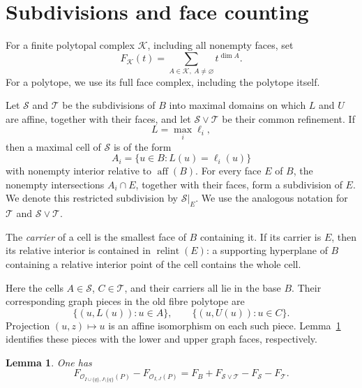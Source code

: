 \documentclass[a4paper,12pt]{amsart}
\newtheorem{lemma}[theorem]{Lemma}
\theoremstyle{definition}
\theoremstyle{remark}
\newcommand{\OO}{\mathcal O}
\newcommand{\relint}{\operatorname{relint}}
\begin{document}
\section{Subdivisions and face counting}\label{sec:counting}

For a finite polytopal complex $\mathcal K$, including all nonempty faces, set
\[
 F_{\mathcal K}(t)=  \sum_{A\in\mathcal K,\ A\neq\varnothing}t^{\dim A}.
\]
For a polytope, we use its full face complex, including the polytope itself.

Let $\mathcal S$ and $\mathcal T$ be the subdivisions of $B$ into maximal domains on which $L$ and $U$ are affine, together with their faces, and let $\mathcal S\vee\mathcal T$ be their common refinement. 
If
\[
 L=\max_i\ell_i,
\]
then a maximal cell of $\mathcal S$ is of the form
\[
 A_i=\{u\in B:L(u)=\ell_i(u)\}
\]
with nonempty interior relative to $\operatorname{aff}(B)$. 
For every face $E$ of $B$, the nonempty intersections $A_i\cap E$, together with their faces, form a subdivision of $E$. 
We denote this restricted subdivision by $\mathcal S|_E$. 
We use the analogous notation for $\mathcal T$ and $\mathcal S\vee\mathcal T$.

The \emph{carrier} of a cell is the smallest face of $B$ containing it. 
If its carrier is $E$, then its relative interior is contained in $\relint(E)$: a supporting hyperplane of $B$ containing a relative interior point of the cell contains the whole cell.

Here the cells $A\in\mathcal S$, $C\in\mathcal T$, and their carriers all lie in the base $B$. 
Their corresponding graph pieces in the old fibre polytope are
\[
 \{(u,L(u)):u\in A\},\qquad  \{(u,U(u)):u\in C\}.
\]
Projection $(u,z)\mapsto u$ is an affine isomorphism on each such piece. 
Lemma~\ref{lem:faceidentity} identifies these pieces with the lower and upper graph faces, respectively.


\begin{lemma}\label{lem:faceidentity}
One has
\begin{equation}\label{eq:faceidentity}
 F_{\OO_{I\cup\{q\},J\setminus\{q\}}(P)}-F_{\OO_{I,J}(P)}  =F_B+F_{\mathcal S\vee\mathcal T}-F_{\mathcal S}-F_{\mathcal T}.
\end{equation}
\end{lemma}
\end{document}
